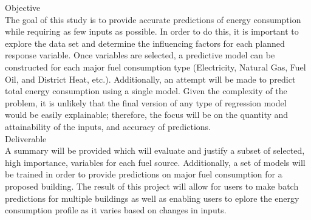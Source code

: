 {\Large {Objective}}
\\
The goal of this study is to provide accurate predictions of energy consumption while requiring as few inputs as possible.  In order to do this, it is important to explore the data set and determine the influencing factors for each planned response variable.  Once variables are selected, a predictive model can be constructed for each major fuel consumption type (Electricity, Natural Gas, Fuel Oil, and District Heat, etc.).  Additionally, an attempt will be made to predict total energy consumption using a single model.  Given the complexity of the problem, it is unlikely that the final version of any type of regression model would be easily explainable; therefore, the focus will be on the quantity and attainability of the inputs, and accuracy of predictions. 
\\[0.125in]
{\Large {Deliverable}}
\\
A summary will be provided which will evaluate and justify a subset of selected, high importance, variables for each fuel source.  Additionally, a set of models will be trained in order to provide predictions on major fuel consumption for a proposed building.  The result of this project will allow for users to make batch predictions for multiple buildings as well as enabling users to eplore the energy consumption profile as it varies based on changes in inputs.